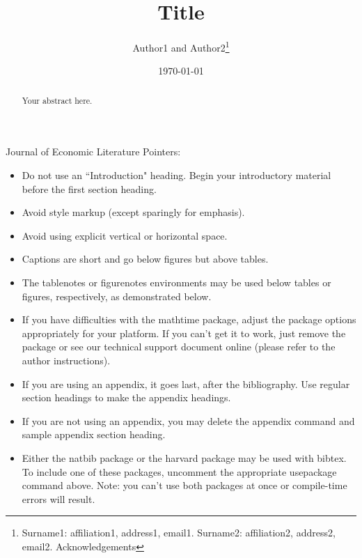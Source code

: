\documentclass[JEL,
finalmode,  %
]{AEA}
\begin{document}
\title{Title}
\author{Author1 and Author2\thanks{
        Surname1: affiliation1, address1, email1. Surname2: affiliation2, address2,
        email2. Acknowledgements}}
\date{\today}
\JEL{}
\Keywords{}

\begin{abstract}
    Your abstract here.
\end{abstract}

\maketitle

Journal of Economic Literature Pointers:

\begin{itemize}
    \item Do not use an ``Introduction" heading. Begin your introductory material  before the first section heading.
          
    \item Avoid style markup (except sparingly for emphasis).
          
    \item Avoid using explicit vertical or horizontal space.
          
    \item Captions are short and go below figures but above tables.
          
    \item The tablenotes or figurenotes environments may be used below tables
          or figures, respectively, as demonstrated below.
          
    \item If you have difficulties with the mathtime package, adjust the package
          options appropriately for your platform. If you can't get it to work, just
          remove the package or see our technical support document online (please
          refer to the author instructions).
          
    \item If you are using an appendix, it goes last, after the bibliography.
          Use regular section headings to make the appendix headings.
          
    \item If you are not using an appendix, you may delete the appendix command
          and sample appendix section heading.
          
    \item Either the natbib package or the harvard package may be used with bibtex.
          To include one of these packages, uncomment the appropriate usepackage command
          above. Note: you can't use both packages at once or compile-time errors will result.
          
\end{itemize}
\end{document}
